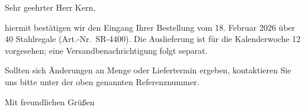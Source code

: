 \documentclass[modern,guides,footercenter,infoblock,lang=german]{onlinebrief24}
\begin{document}
\begin{letter}{}
    \opening{Sehr geehrter Herr Kern,}

    hiermit best\"atigen wir den Eingang Ihrer Bestellung vom 18.
    Februar 2026 \"uber 40 Stahlregale (Art.-Nr.\ SR-4400). Die
    Auslieferung ist f\"ur die Kalenderwoche 12 vorgesehen; eine
    Versandbenachrichtigung folgt separat.

    Sollten sich \"Anderungen an Menge oder Liefertermin ergeben,
    kontaktieren Sie uns bitte unter der oben genannten Referenznummer.

    \closing{Mit freundlichen Gr\"u{\ss}en}
\end{letter}
\end{document}
